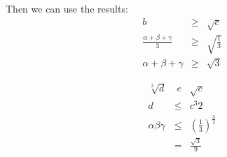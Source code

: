 Then we can use the results:
\begin{eqnarray*}
  b &\ge& \sqrt{c} \\
  \frac{\alpha + \beta + \gamma}{3} &\ge& \sqrt{\frac{1}{3}} \\
  \alpha + \beta + \gamma &\ge& \sqrt{3}
\end{eqnarray*}

\begin{eqnarray*}
  \sqrt[3]{d} &\;e& \sqrt{c} \\
  d &\le& c^{3}{2} \\
  \alpha \beta \gamma &\le& \left(\frac{1}{3}\right)^{\frac{3}{2}} \\
                      &=& \frac{\sqrt{3}}{9}
\end{eqnarray*}
